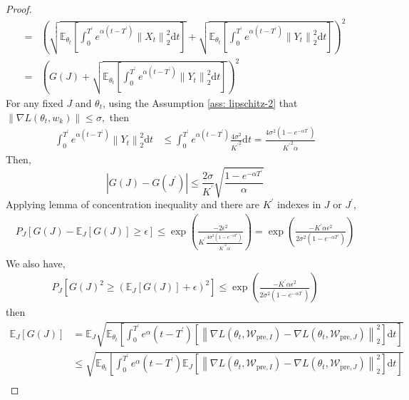 \begin{proof}
$$\begin{aligned}
		=&\left(\sqrt{\mathbb{E}_{\theta_t}\left[\int_0^{T^\prime}e^{\alpha(t-{T^\prime})}\left\|X_t\right\|_2^2\mathrm{d}t\right]}+\sqrt{\mathbb{E}_{\theta_t}\left[\int_0^{T^\prime}e^{\alpha(t-{T^\prime})}\left\|Y_t\right\|_2^2\mathrm{d}t\right]}\right)^2 \\
		=&\left(G(J)+\sqrt{\mathbb{E}_{\theta_t}\left[\int_0^{T^\prime}e^{\alpha(t-{T^\prime})}\left\|Y_t\right\|_2^2\mathrm{d}t\right]}\right)^2
	\end{aligned}
	$$
	For any fixed $J$ and $\theta_t$, using the Assumption \ref{ass: lipschitz-2} that $\left\|\nabla L(\theta_t, w_k)\right\| \leq \sigma,$ then
	$$
	\begin{aligned}
		\int_0^{T^\prime}e^{\alpha(t-{T^\prime})}\left\|Y_t\right\|_2^2\mathrm{d}t& \leq\int_0^{T^\prime}e^{\alpha(t-{T^\prime})}\frac{4\sigma^2}{{K^\prime}^2}\mathrm{d}t=\frac{4\sigma^2(1-e^{-\alpha {T^\prime}})}{{K^\prime}^2\alpha}
	\end{aligned}
	$$
	Then,
	$$
	\left|G(J)-G(J^{\prime})\right| \leq  \frac{2\sigma}{K^\prime} \sqrt{\frac{1-e^{-\alpha {T^\prime}}}{\alpha}}
	$$
	Applying lemma of concentration inequality and there are $K^\prime$ indexes in $J$ or $J^\prime$,
	$$
	\begin{aligned}
		P_J\left[G(J)-\mathbb{E}_J[G(J)]\geq \epsilon\right]\leq \exp\left(\frac{-2\epsilon^2}{K^\prime \frac{4\sigma^2(1-e^{-\alpha {T^\prime}})}{{K^\prime}^2\alpha}}\right)=\exp\left(\frac{-K^\prime\alpha\epsilon^2}{2\sigma^2(1-e^{-\alpha {T^\prime}})}\right) \\
	\end{aligned}
	$$
	We also have,
	$$
	\begin{aligned}
		P_J\left[G(J)^2 \geq (\mathbb{E}_J[G(J)]+\epsilon)^2\right]\leq \exp\left(\frac{-K^\prime\alpha\epsilon^2}{2\sigma^2(1-e^{-\alpha {T^\prime}})}\right)
	\end{aligned}
	$$
	then
	$$
	\begin{aligned}
		\mathbb{E}_{J}[G(J)]& =\mathbb{E}_J\sqrt{\mathbb{E}_{\theta_t}\left[\int_0^{T^\prime} e^\alpha(t-{T^\prime})\left[\left\|\nabla L(\theta_t, \mathcal{W}_{\text{pre},I})-\nabla L(\theta_t, \mathcal{W}_{\text{pre},J})\right\|_2^2\right]\mathrm{d}t\right]}  \\
		&\leq\sqrt{\mathbb{E}_{\theta_t}\left[\int_0^{T^\prime} e^\alpha(t-{T^\prime})\mathbb{E}_J\left[\left\|\nabla L(\theta_t, \mathcal{W}_{\text{pre},I})-\nabla L(\theta_t, \mathcal{W}_{\text{pre},J})\right\|_2^2\right]\mathrm{d}t\right]} \\

\end{aligned}$$
\end{proof}
